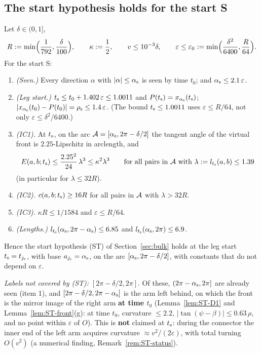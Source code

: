 \subsection{The start hypothesis holds for the start S}

\begin{theorem}\label{thm:ST}
Let $\delta\in(0,1]$,
\[
R:=\min\Bigl(\frac1{792},\frac\delta{100}\Bigr),\qquad\kappa:=\frac12,\qquad v\le10^{-3}\delta,\qquad
\varepsilon\le\varepsilon_0:=\min\Bigl(\frac{\delta^2}{6400},\frac R{64}\Bigr).
\]
For the start S:
\begin{enumerate}
\item[1.] \emph{(Seen.)} Every direction $\alpha$ with $|\alpha|\le\alpha_{\mathrm s}$ is seen by time $t_0$; and $\alpha_{\mathrm s}\le2.1\,\varepsilon$.
\item[2.] \emph{(Leg start.)} $t_{\mathrm s}\le t_0+1.402\,\varepsilon\le1.0011$ and $P(t_{\mathrm s})=x_{\alpha_{\mathrm s}}(t_{\mathrm s})$;
$|x_{\alpha_{\mathrm s}}(t_0)-P(t_0)|=\rho_{\mathrm s}\le1.4\,\varepsilon$. (The bound $t_{\mathrm s}\le1.0011$ uses $\varepsilon\le R/64$, not only
$\varepsilon\le\delta^2/6400$.)
\item[3.] \emph{\textup{(IC1)}.} At $t_{\mathrm s}$, on the arc $\mathcal A=[\alpha_{\mathrm s},2\pi-\delta/2]$ the tangent angle of the virtual front is
$2.25$-Lipschitz in arclength, and
\[
E(a,b;t_{\mathrm s})\le\frac{2.25^2}{24}\,\lambda^3\le\kappa^2\lambda^3\qquad\text{for all pairs in $\mathcal A$ with }\lambda:=l_{t_{\mathrm s}}(a,b)\le1.39
\]
(in particular for $\lambda\le32R$).
\item[4.] \emph{\textup{(IC2)}.} $c(a,b;t_{\mathrm s})\ge16R$ for all pairs in $\mathcal A$ with $\lambda>32R$.
\item[5.] \emph{\textup{(IC3)}.} $\kappa R\le1/1584$ and $\varepsilon\le R/64$.
\item[6.] \emph{(Lengths.)} $l_{t_{\mathrm s}}(\alpha_{\mathrm s},2\pi-\alpha_{\mathrm s})\le6.85$ and $l_{t_{\mathrm s}}(\alpha_{\mathrm s},2\pi)\le6.9$.
\end{enumerate}
Hence the start hypothesis \textup{(ST)} of Section~\ref{sec:bulk} holds at the leg start $t_{\mathrm s}=t_{j_{\mathrm s}}$, with base $a_{j_{\mathrm s}}=\alpha_{\mathrm s}$, on
the arc $[\alpha_{\mathrm s},2\pi-\delta/2]$, with constants that do not depend on $\varepsilon$.

\emph{Labels not covered by \textup{(ST)}:} $[2\pi-\delta/2,2\pi]$. Of these, $(2\pi-\alpha_{\mathrm s},2\pi]$ are already seen (item 1), and
$[2\pi-\delta/2,2\pi-\alpha_{\mathrm s}]$ is the arm left behind, on which the front is the mirror image of the right arm \textbf{at time $t_0$}
(Lemma~\ref{lem:ST-D1} and Lemma~\ref{lem:ST-front}(g): at time $t_0$, curvature $\le2.2$, $|\tan(\psi-\beta)|\le0.63\,\rho$, and no
point within $\varepsilon$ of $O$). This is \textbf{not} claimed at $t_{\mathrm s}$: during the connector the inner end of the left arm
acquires curvature $\approx v^2/(2\varepsilon)$, with total turning $O(v^2)$ (a numerical finding, Remark~\ref{rem:ST-status}).
\end{theorem}
